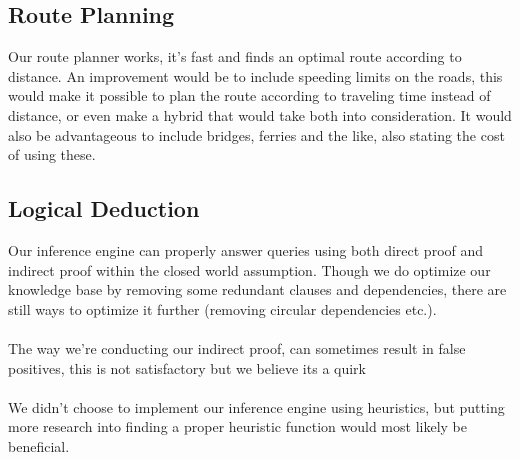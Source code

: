 \documentclass[11pt]{article}
\begin{document}
\subsection{Route Planning}
Our route planner works, it's fast and finds an optimal route according to distance. An improvement would be to include speeding limits on the roads, this would make it possible to plan the route according to traveling time instead of distance, or even make a hybrid that would take both into consideration. It would also be advantageous to include bridges, ferries and the like, also stating the cost of using these.

\subsection{Logical Deduction}
Our inference engine can properly answer queries using both direct proof and indirect proof within the closed world assumption. Though we do optimize our knowledge base by removing some redundant clauses and dependencies, there are still ways to optimize it further (removing circular dependencies etc.).\\
\\
The way we're conducting our indirect proof, can sometimes result in false positives, this is not satisfactory but we believe its a quirk 
\\
\\
We didn't choose to implement our inference engine using heuristics, but putting more research into finding a proper heuristic function would most likely be beneficial.
\end{document}
